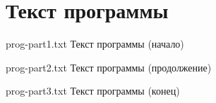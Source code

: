 \chapter{Текст программы}

{prog-part1.txt} %
{Текст программы (начало)} %

{prog-part2.txt} %
{Текст программы (продолжение)} %

{prog-part3.txt} %
{Текст программы (конец)} %
